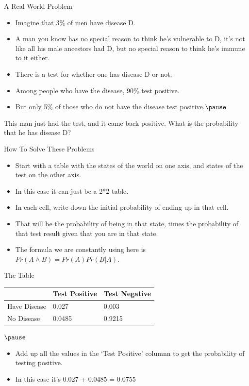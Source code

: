 \documentclass[
  ignorenonframetext,
]{beamer}
\providecommand{\tightlist}{%
  \setlength{\itemsep}{0pt}\setlength{\parskip}{0pt}}
\renewcommand{\,}{\text{, }}
\begin{document}
\begin{frame}{A Real World Problem}
\protect\hypertarget{a-real-world-problem}{}

\begin{itemize}
\tightlist
\item
  Imagine that 3\% of men have disease D.
\item
  A man you know has no special reason to think he's vulnerable to D,
  it's not like all his male ancestors had D, but no special reason to
  think he's immune to it either.
\item
  There is a test for whether one has disease D or not.
\item
  Among people who have the disease, 90\% test positive.
\item
  But only 5\% of those who do not have the disease test
  positive.\(\pause\)
\end{itemize}

This man just had the test, and it came back positive. What is the
probability that he has disease D?

\end{frame}

\begin{frame}{How To Solve These Problems}
\protect\hypertarget{how-to-solve-these-problems}{}

\begin{itemize}
\tightlist
\item
  Start with a table with the states of the world on one axis, and
  states of the test on the other axis.
\item
  In this case it can just be a 2*2 table.
\item
  In each cell, write down the initial probability of ending up in that
  cell.
\item
  That will be the probability of being in that state, times the
  probability of that test result given that you are in that state.
\item
  The formula we are constantly using here is
  \(Pr(A \wedge B) = Pr(A) Pr(B | A)\).
\end{itemize}

\end{frame}

\begin{frame}{The Table}
\protect\hypertarget{the-table}{}

\begin{longtable}[]{@{}lll@{}}
\toprule
& Test Positive & Test Negative\tabularnewline
\midrule
\endhead
Have Disease & 0.027 & 0.003\tabularnewline
No Disease & 0.0485 & 0.9215\tabularnewline
\bottomrule
\end{longtable}

\(\pause\)

\begin{itemize}
\tightlist
\item
  Add up all the values in the `Test Positive' columnn to get the
  probability of testing positive.
\item
  In this case it's 0.027 + 0.0485 = 0.0755
\end{itemize}

\end{frame}
\end{document}
